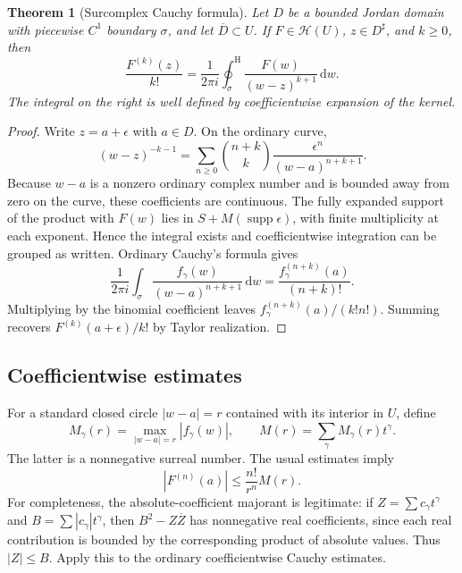 \documentclass[11pt,letterpaper]{article}
\numberwithin{equation}{section}
\newtheorem{theorem}{Theorem}[section]
\theoremstyle{definition}
\theoremstyle{remark}
\newcommand{\HH}{\mathcal{H}}
\newcommand{\dd}{\,\mathrm{d}}
\newcommand{\supp}{\operatorname{supp}}
\newcommand{\cooint}{\mathop{\oint}\nolimits^{\mathrm H}}
\begin{document}
\begin{theorem}[Surcomplex Cauchy formula]\label{thm:cauchyformula}
Let $D$ be a bounded Jordan domain with piecewise $C^1$ boundary $\sigma$,
and let $\overline D\subset U$. If $F\in\HH(U)$, $z\in D^\sharp$, and
$k\ge0$, then
\begin{equation}\label{eq:cauchyformula}
 \frac{F^{(k)}(z)}{k!}
 =\frac1{2\pi i}\cooint_\sigma
      \frac{F(w)}{(w-z)^{k+1}}\dd w.
\end{equation}
The integral on the right is well defined by coefficientwise expansion of
the kernel.
\end{theorem}
\begin{proof}
Write $z=a+\epsilon$ with $a\in D$. On the ordinary curve,
\begin{equation}\label{eq:kernel}
 (w-z)^{-k-1}
 =\sum_{n\ge0}\binom{n+k}{k}
    \frac{\epsilon^n}{(w-a)^{n+k+1}}.
\end{equation}
Because $w-a$ is a nonzero ordinary complex number and is bounded away from
zero on the curve, these coefficients are continuous. The fully expanded
support of the product with $F(w)$ lies in
$S+M(\supp\epsilon)$, with finite multiplicity at each exponent. Hence the
integral exists and coefficientwise integration can be grouped as written.
Ordinary Cauchy's formula gives
\[
 \frac1{2\pi i}\int_\sigma
 \frac{f_\gamma(w)}{(w-a)^{n+k+1}}\dd w
 =\frac{f_\gamma^{(n+k)}(a)}{(n+k)!}.
\]
Multiplying by the binomial coefficient leaves
$f_\gamma^{(n+k)}(a)/(k!n!)$. Summing recovers
$F^{(k)}(a+\epsilon)/k!$ by Taylor realization.
\end{proof}

\subsection{Coefficientwise estimates}

For a standard closed circle $|w-a|=r$ contained with its interior in $U$, define
\[
 M_\gamma(r)=\max_{|w-a|=r}|f_\gamma(w)|,
 \qquad M(r)=\sum_\gamma M_\gamma(r)t^\gamma.
\]
The latter is a nonnegative surreal number. The usual estimates imply
\begin{equation}\label{eq:cauchyestimates}
 |F^{(n)}(a)|\le \frac{n!}{r^n}M(r).
\end{equation}
For completeness, the absolute-coefficient majorant is legitimate: if
$Z=\sum c_\gamma t^\gamma$ and $B=\sum |c_\gamma|t^\gamma$, then
$B^2-Z\overline Z$ has nonnegative real coefficients, since each real
contribution is bounded by the corresponding product of absolute values.
Thus $|Z|\le B$. Apply this to the ordinary coefficientwise Cauchy estimates.
\end{document}
